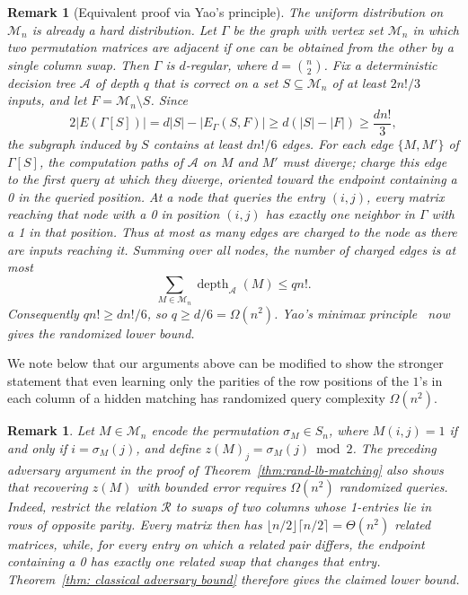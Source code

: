 \documentclass[11pt]{article}
\newcommand{\cA}{\mathcal{A}}
\newcommand{\cM}{\mathcal{M}}
\newcommand{\cR}{\mathcal{R}}
\newtheorem{remark}[theorem]{Remark}
\begin{document}
\begin{remark}[Equivalent proof via Yao's principle]
The uniform distribution on $\cM_n$ is already a hard distribution. Let $\Gamma$ be the graph with vertex set $\cM_n$ in which two permutation matrices are adjacent if one can be obtained from the other by a single column swap. Then $\Gamma$ is $d$-regular, where $d=\binom{n}{2}$. Fix a deterministic decision tree $\cA$ of depth $q$ that is correct on a set $S\subseteq \cM_n$ of at least $2n!/3$ inputs, and let $F=\cM_n\setminus S$. Since
\[
2|E(\Gamma[S])| = d|S|-|E_\Gamma(S,F)|
\ge d(|S|-|F|)\ge \frac{dn!}{3},
\]
the subgraph induced by $S$ contains at least $dn!/6$ edges.
For each edge $\{M,M'\}$ of $\Gamma[S]$, the computation paths of $\cA$ on $M$ and $M'$ must diverge; charge this edge to the first query at which they diverge, oriented toward the endpoint containing a 0 in the queried position. At a node that queries the entry $(i,j)$, every matrix reaching that node with a 0 in position $(i,j)$ has exactly one neighbor in $\Gamma$ with a 1 in that position. Thus at most as many edges are charged to the node as there are inputs reaching it. Summing over all nodes, the number of charged edges is at most
\[
\sum_{M\in\cM_n}\operatorname{depth}_{\cA}(M)\le qn!.
\]
Consequently $qn!\ge dn!/6$, so $q\ge d/6=\Omega(n^2)$. Yao's minimax principle~\cite{Yao77} now gives the randomized lower bound.
\end{remark}

We note below that our arguments above can be modified to show the stronger statement that even learning only the parities of the row positions of the $1$'s in each column of a hidden matching has randomized query complexity $\Omega(n^2)$.

\begin{remark}\label{rem:randomized-parity-matching}
Let $M\in\cM_n$ encode the permutation $\sigma_M\in S_n$, where $M(i,j)=1$ if and only if $i=\sigma_M(j)$, and define $z(M)_j=\sigma_M(j)\bmod 2$. The preceding adversary argument in the proof of Theorem~\ref{thm:rand-lb-matching} also shows that recovering $z(M)$ with bounded error requires $\Omega(n^2)$ randomized queries. Indeed, restrict the relation $\cR$ to swaps of two columns whose 1-entries lie in rows of opposite parity. Every matrix then has $\lfloor n/2\rfloor\lceil n/2\rceil=\Theta(n^2)$ related matrices, while, for every entry on which a related pair differs, the endpoint containing a 0 has exactly one related swap that changes that entry. Theorem~\ref{thm: classical adversary bound} therefore gives the claimed lower bound.
\end{remark}
\end{document}
